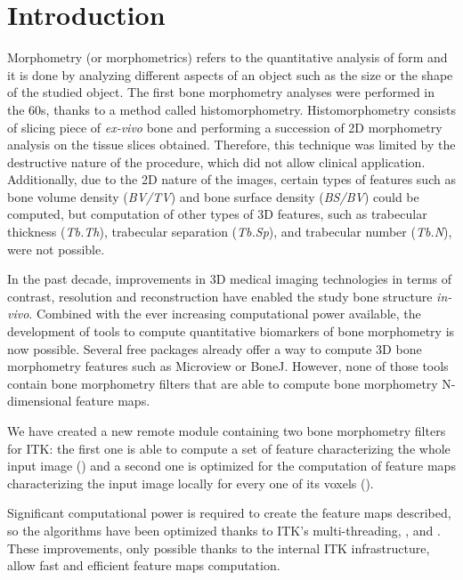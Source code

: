 \documentclass{InsightArticle}
\newcommand{\IJhandlerIDnumber}{3588}
\begin{document}
\IJhandlenote{\IJhandlerIDnumber}
\newpage
\tableofcontents
\newpage
\section{Introduction}
\label{sec:intro}

Morphometry (or morphometrics) refers to the quantitative analysis of form and it is done by analyzing different aspects of an object such as the size or the shape of the studied object. The first bone morphometry analyses were performed in the 60s, thanks to a method called histomorphometry. Histomorphometry consists of slicing piece of \textit{ex-vivo} bone and performing a succession of 2D morphometry analysis on the tissue slices obtained. Therefore, this technique was limited by the destructive nature of the procedure, which did not allow clinical application. Additionally, due to the 2D nature of the images, certain types of features such as bone volume density (\textit{BV/TV}) and bone surface density (\textit{BS/BV})\cite{BoneMorpho1} could be computed, but computation of other types of 3D features, such as trabecular thickness (\textit{Tb.Th}), trabecular separation (\textit{Tb.Sp}), and trabecular number (\textit{Tb.N}), were not possible\cite{BoneMorpho2}.

In the past decade, improvements in 3D medical imaging technologies in terms of contrast, resolution and reconstruction have enabled the study bone structure \textit{in-vivo}. Combined with the ever increasing computational power available, the development of tools to compute quantitative biomarkers of bone morphometry is now possible. Several free packages already offer a way to compute 3D bone morphometry features such as Microview or BoneJ. However, none of those tools contain bone morphometry filters that are able to compute bone morphometry N-dimensional feature maps.

We have created a new remote module containing two bone morphometry filters for ITK: the first one is able to compute a set of feature characterizing the whole input image () and a second one is optimized for the computation of feature maps characterizing the input image locally for every one of its voxels ().

Significant computational power is required to create the feature maps described, so the  algorithms have been optimized thanks to ITK's multi-threading, , and . These improvements, only possible thanks to the internal ITK infrastructure, allow fast and efficient feature maps computation.
\end{document}
